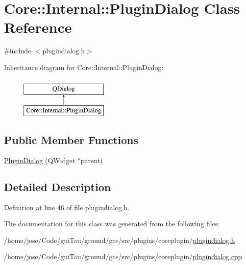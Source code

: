 \hypertarget{class_core_1_1_internal_1_1_plugin_dialog}{\section{Core\-:\-:Internal\-:\-:Plugin\-Dialog Class Reference}
\label{class_core_1_1_internal_1_1_plugin_dialog}
}


{\ttfamily \#include $<$plugindialog.\-h$>$}

Inheritance diagram for Core\-:\-:Internal\-:\-:Plugin\-Dialog\-:\begin{figure}[H]
\begin{center}
\leavevmode
\includegraphics[height=2.000000cm]{class_core_1_1_internal_1_1_plugin_dialog}
\end{center}
\end{figure}
\subsection*{Public Member Functions}
\begin{DoxyCompactItemize}
\item 
\hyperlink{group___core_plugin_ga2e7647eb2b6c3adf436dac649628b8cd}{Plugin\-Dialog} (Q\-Widget $\ast$parent)
\end{DoxyCompactItemize}


\subsection{Detailed Description}


Definition at line 46 of file plugindialog.\-h.



The documentation for this class was generated from the following files\-:\begin{DoxyCompactItemize}
\item 
/home/jose/\-Code/gui\-Tau/ground/gcs/src/plugins/coreplugin/\hyperlink{plugins_2coreplugin_2plugindialog_8h}{plugindialog.\-h}\item 
/home/jose/\-Code/gui\-Tau/ground/gcs/src/plugins/coreplugin/\hyperlink{plugins_2coreplugin_2plugindialog_8cpp}{plugindialog.\-cpp}\end{DoxyCompactItemize}
